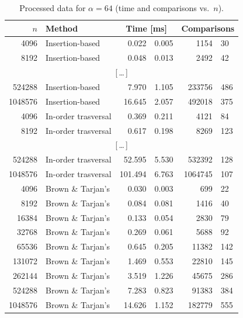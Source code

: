 \documentclass[12pt]{article}
\begin{document}
\begin{table}[H]
\centering
\caption{Processed data for $\alpha=64$ (time and comparisons vs.\ $n$).}
\begin{tabular}{r l r@{\,$\pm$\,}l r@{\,$\pm$\,}l}
\hline
$n$ & Method &
\multicolumn{2}{c}{Time [ms]} &
\multicolumn{2}{c}{Comparisons} \\
\hline
4096   & Insertion-based     & 0.022 & 0.005 & 1154   & 30  \\
8192   & Insertion-based     & 0.048 & 0.013 & 2492   & 42  \\
\multicolumn{6}{c}{[\,\dots\,]} \\
524288 & Insertion-based     & 7.970 & 1.105 & 233756 & 486 \\
1048576& Insertion-based     &16.645 & 2.057 & 492018 & 375 \\[2pt]
4096   & In-order trasversal & 0.369 & 0.211 & 4121   & 84  \\
8192   & In-order trasversal & 0.617 & 0.198 & 8269   & 123 \\
\multicolumn{6}{c}{[\,\dots\,]} \\\
524288 & In-order trasversal &52.595 & 5.530 &532392  & 128 \\
1048576& In-order trasversal &101.494& 6.763 &1064745 & 107 \\[2pt]
4096   & Brown \& Tarjan's   & 0.030 & 0.003 & 699    & 22  \\
8192   & Brown \& Tarjan's   & 0.084 & 0.081 & 1416   & 40  \\
16384  & Brown \& Tarjan's   & 0.133 & 0.054 & 2830   & 79  \\
32768  & Brown \& Tarjan's   & 0.269 & 0.061 & 5688   & 92  \\
65536  & Brown \& Tarjan's   & 0.645 & 0.205 &11382   & 142 \\
131072 & Brown \& Tarjan's   & 1.469 & 0.553 &22810   & 145 \\
262144 & Brown \& Tarjan's   & 3.519 & 1.226 &45675   & 286 \\
524288 & Brown \& Tarjan's   & 7.283 & 0.823 &91383   & 384 \\
1048576& Brown \& Tarjan's   &14.626 & 1.152 &182779  & 555 \\
\hline
\end{tabular}
\label{tab:processed-alpha64}
\end{table}
\end{document}
